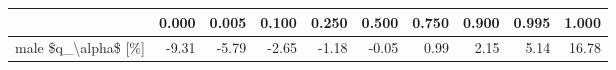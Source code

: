 \begin{tabular}{lrrrrrrrrr}
\toprule
{} &  0.000 &  0.005 &  0.100 &  0.250 &  0.500 &  0.750 &  0.900 &  0.995 &  1.000 \\
\midrule
male \$q\_\textbackslash alpha\$ [\%] &  -9.31 &  -5.79 &  -2.65 &  -1.18 &  -0.05 &   0.99 &   2.15 &   5.14 &  16.78 \\
\bottomrule
\end{tabular}
